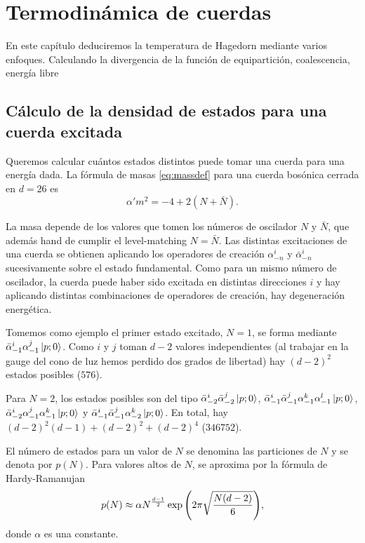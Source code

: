 \chapter{Termodinámica de cuerdas}

En este capítulo deduciremos la temperatura de Hagedorn mediante varios enfoques.
Calculando la divergencia de la función de equipartición, coalescencia, energía libre

\section{Cálculo de la densidad de estados para una cuerda excitada}

Queremos calcular cuántos estados distintos puede tomar una cuerda para una energía dada.
La fórmula de masas \ref{eq:massdef} para una cuerda bosónica cerrada en $d=26$ es
\begin{equation}
  \alpha' m^2=-4+2(N+\bar N).
\end{equation}

La masa depende de los valores que tomen los números de oscilador $N$ y $\bar N$, que además
hand de cumplir el level-matching $N=\bar N$.
Las distintas excitaciones de una cuerda se obtienen aplicando los operadores
de creación $\alpha^i_{-n}$ y $\bar \alpha^i_{-n}$ sucesivamente sobre el estado fundamental.
Como para un mismo número de oscilador, la cuerda puede haber sido excitada en distintas direcciones
$i$ y hay aplicando distintas combinaciones de operadores de creación, hay degeneración energética.

Tomemos como ejemplo el primer estado excitado, $N=1$, se forma mediante $\bar \alpha^i_{-1} \alpha^j_{-1} \ket{p;0}$.
Como $i$ y $j$ toman $d-2$ valores independientes (al trabajar en la gauge del cono de luz hemos perdido dos grados de libertad)
hay $(d-2)^2$ estados posibles ($576$).

Para $N=2$, los estados posibles son del tipo $\bar \alpha^i_{-2}\bar \alpha^j_{-2}\ket{p;0}$, 
$\bar \alpha^i_{-1} \bar \alpha^j_{-1} \alpha^k_{-1} \alpha^l_{-1} \ket{p;0}$,
$\bar \alpha^i_{-2} \alpha^j_{-1} \alpha^k_{-1}\ket{p;0}$ y $\bar \alpha^i_{-1} \bar \alpha^j_{-1} \alpha^k_{-2} \ket{p;0}$.
En total, hay $(d-2)^2(d-1) + (d-2)^2 +(d-2)^4$ ($346752$).


El número de estados para un valor de $N$ se denomina las particiones de $N$ y se denota por $p(N)$.
Para valores altos de $N$, se aproxima por la fórmula de Hardy-Ramanujan
\begin{equation}
  p(N)\approx \alpha N^ {\frac{d-1}{2}}\exp\qty(2\pi\sqrt{\frac{N(d-2)}{6}}),
\end{equation}
donde $\alpha$ es una constante.

